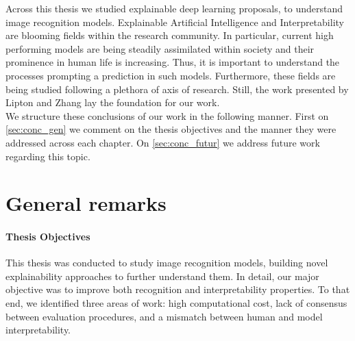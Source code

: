 \label{concs}
Across this thesis we studied explainable deep learning proposals, to understand image 
recognition models. Explainable Artificial Intelligence and Interpretability are blooming fields 
within the research community. In particular, current high performing models are 
being steadily assimilated within society and their prominence in human life is increasing. Thus, 
it is important to understand the processes prompting a prediction in such models. 
Furthermore, these fields are being studied following a plethora of axis of research. Still, the 
work presented by Lipton \autocite{mythos_interp} and Zhang \autocite{zhang2021survey} lay the 
foundation for our work.\\

We structure these conclusions of our work in the following manner. First on \autoref{sec:conc_gen} 
we comment on the thesis objectives and the manner they were addressed across each chapter. On 
\autoref{sec:conc_futur} we address future work regarding this topic.\\

\section{General remarks}
\label{sec:conc_gen}

\paragraph{Thesis Objectives}
\label{sub:conc_obj}
This thesis was conducted to study image recognition models, building novel explainability 
approaches to further understand them. In detail, our major objective was to improve both 
recognition and interpretability properties. To that end, we identified three areas of  
work: high computational cost, lack of consensus between evaluation procedures, and a mismatch 
between human and model interpretability.\\

